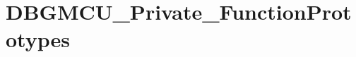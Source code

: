 \hypertarget{group___d_b_g_m_c_u___private___function_prototypes}{\section{D\-B\-G\-M\-C\-U\-\_\-\-Private\-\_\-\-Function\-Prototypes}
\label{group___d_b_g_m_c_u___private___function_prototypes}
}
